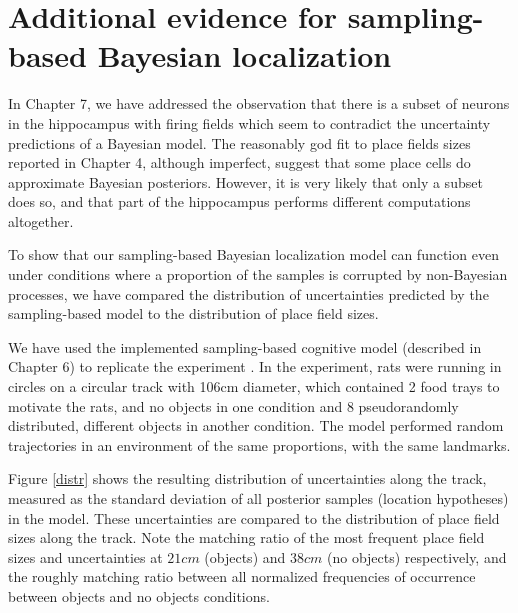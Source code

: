 
\chapter{Additional evidence for sampling-based Bayesian localization}
\label{apx:pfev}

In Chapter 7, we have addressed the observation that there is a subset of neurons in the hippocampus with firing fields which seem to contradict the uncertainty predictions of a Bayesian model. The reasonably god fit to place fields sizes reported in Chapter 4, although imperfect, suggest that some place cells do approximate Bayesian posteriors. However, it is very likely that only a subset does so, and that part of the hippocampus performs different computations altogether.

To show that our sampling-based Bayesian localization model can function even under conditions where a proportion of the samples is corrupted by non-Bayesian processes, we have compared the distribution of uncertainties predicted by the sampling-based model to the distribution of place field sizes.

We have used the implemented sampling-based cognitive model (described in Chapter 6) to replicate the experiment \citep{burke2011influence}. In the experiment, rats were running in circles on a circular track with 106cm diameter, which contained 2 food trays to motivate the rats, and no objects in one condition and 8 pseudorandomly distributed, different objects in another condition. The model performed random trajectories in an environment of the same proportions, with the same landmarks. 

Figure \ref{distr} shows the resulting distribution of uncertainties along the track, measured as the standard deviation of all posterior samples (location hypotheses) in the model. These uncertainties are compared to the distribution of place field sizes along the track. Note the matching ratio of the most frequent place field sizes and uncertainties at $21cm$ (objects) and $38cm$ (no objects) respectively, and the roughly matching ratio between all normalized frequencies of occurrence between objects and no objects conditions.

